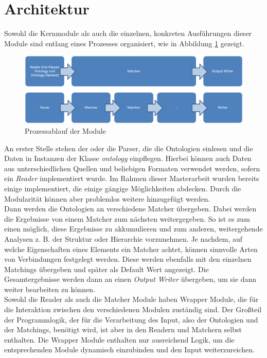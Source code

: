 		\section{Architektur}
		Sowohl die Kernmodule als auch die einzelnen, konkreten Ausführungen dieser
		Module sind entlang eines Prozesses organisiert, wie in Abbildung \ref{fig2}
		gezeigt.
		\begin{figure}[h!]
		\centering
		\includegraphics[width=1.0\textwidth]{pics/Module-overview.png}
		\caption{Prozessablauf der Module}
		\label{fig2}
		\end{figure}
		An erster Stelle stehen der oder die Parser, die die Ontologien einlesen und
		die Daten in Instanzen der Klasse \textit{ontology} einpflegen. Hierbei können
		auch Daten aus unterschiedlichen Quellen und beliebigen Formaten verwendet
		werden, sofern ein \textit{Reader} implementiert wurde. Im Rahmen dieser
		Masterarbeit wurden bereits einige implementiert, die einige gängige
		Möglichkeiten abdecken. Durch die Modularität können aber problemlos weitere
		hinzugefügt werden.\\
		Dann werden die Ontologien an verschiedene Matcher übergeben. Dabei werden
		die Ergebnisse von einem Matcher zum nächsten weitergegeben. So ist es zum
		einen möglich, diese Ergebnisse zu akkumulieren und zum
		anderen, weitergehende Analysen z. B. der Struktur oder Hierarchie vorzunehmen. Je nachdem, auf welche Eigenschaften
		eines Elements ein Matcher achtet, können sinnvolle Arten von Verbindungen
		festgelegt werden. Diese werden ebenfalls mit den einzelnen Matchings
		übergeben und später als Default Wert angezeigt. Die Gesamtergebnisse werden
		dann an einen \textit{Output Writer} übergeben, um sie dann weiter bearbeiten zu können.\\
		Sowohl die Reader als auch die Matcher Module haben Wrapper Module, die für
		die Interaktion zwischen den verschiedenen Modulen zuständig sind. Der
		Großteil der Programmlogik, der für die Verarbeitung des Input, also der
		Ontologien und der Matchings, benötigt wird, ist aber in den Readern und
		Matchern selbst enthalten. Die Wrapper Module enthalten nur ausreichend Logik,
		um die entsprechenden Module dynamisch einzubinden und den Input weiterzureichen.
		
